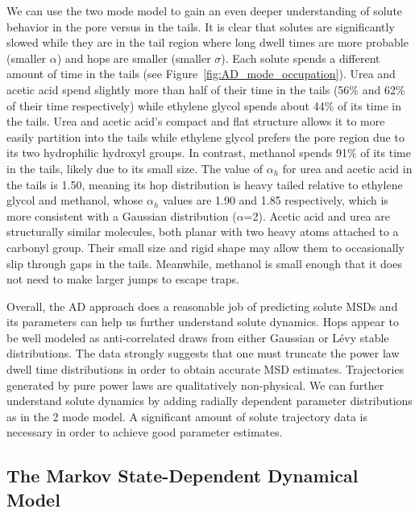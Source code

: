\documentclass[aps,pre,preprint,groupedaddress,longbibliography]{revtex4-2}
\begin{document}
  We can use the two mode model to gain an even deeper understanding of solute behavior
  in the pore versus in the tails. It is clear that solutes are significantly slowed 
  while they are in the tail region where long dwell times are more probable
  (smaller $\alpha$) and hops are smaller (smaller $\sigma$). Each solute spends 
  a different amount of time in the tails (see Figure~\ref{fig:AD_mode_occupation}). 
  Urea and acetic acid spend slightly more than half of their time in the tails 
  (56\% and 62\% of their time respectively) while ethylene glycol spends about 
  44\% of its time in the tails. Urea and acetic acid's compact and flat structure 
  allows it to more easily partition into the tails while ethylene glycol prefers
  the pore region due to its two hydrophilic hydroxyl groups. In contrast, methanol 
  spends 91\% of its time in the tails, likely due to its small size.  
  The value of $\alpha_h$ for urea and acetic acid in the tails is 1.50, meaning its hop distribution
  is heavy tailed relative to ethylene glycol and methanol, whose $\alpha_h$ values are
  1.90 and 1.85 respectively, which is more consistent with a Gaussian distribution ($\alpha$=2).
  Acetic acid and urea are structurally similar molecules, both planar with two heavy atoms attached to a 
  carbonyl group. Their small size and rigid shape may allow them to occasionally slip
  through gaps in the tails. Meanwhile, methanol is small enough that it does not need
  to make larger jumps to escape traps.
  
  Overall, the AD approach does a reasonable job of predicting solute MSDs and its 
  parameters can help us further understand solute dynamics. Hops appear to be well
  modeled as anti-correlated draws from either Gaussian or L\'evy stable distributions. 
  The data strongly suggests that one must truncate the power law dwell time 
  distributions in order to obtain accurate MSD estimates. Trajectories generated 
  by pure power laws are qualitatively non-physical. We can further understand
  solute dynamics by adding radially dependent parameter distributions as in the 
  2 mode model. A significant amount of solute trajectory data is necessary 
  in order to achieve good parameter estimates. 

  \subsection{The Markov State-Dependent Dynamical Model}\label{section:msm_results}
  
\end{document}

